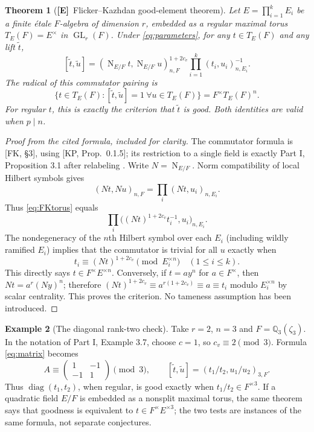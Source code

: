\documentclass[11pt]{article}
\newcommand{\GL}{\operatorname{GL}}
\newcommand{\Nm}{\operatorname{N}}
\newcommand{\Etag}{\textnormal{\textbf{[E]}}}
\theoremstyle{plain}
\newtheorem{theorem}{Theorem}[section]
\theoremstyle{definition}
\newtheorem{example}[theorem]{Example}
\begin{document}
\begin{theorem}[\Etag\ Flicker--Kazhdan good-element theorem]\label{thm:FKgood}
Let $E=\prod_{i=1}^kE_i$ be a finite \emph{\'etale} $F$-algebra
of dimension $r$, embedded as a regular maximal torus
$T_E(F)=E^\times$ in $\GL_r(F)$.  Under \eqref{eq:parameters},
for any $t\in T_E(F)$ and any lift $\widetilde t$,
\begin{equation}\label{eq:FKtorus}
 [\widetilde t,\widetilde u]
 =(\Nm_{E/F}t,\Nm_{E/F}u)_{n,F}^{1+2c_v}
   \prod_{i=1}^k(t_i,u_i)_{n,E_i}^{-1}.
\end{equation}
The radical of this commutator pairing is
\begin{equation}\label{eq:everygood}
 \{t\in T_E(F):[\widetilde t,\widetilde u]=1\ \forall u\in T_E(F)\}
 =F^\times T_E(F)^n.
\end{equation}
For regular $t$, this is exactly the criterion that $\widetilde t$
is good.  Both identities are valid when $p\mid n$.
\end{theorem}
\begin{proof}[Proof from the cited formula, included for clarity]
The commutator formula is [FK, \S3], using [KP, Prop.~0.1.5];
its restriction to a single field is exactly Part I,
Proposition 3.1 after relabeling \cite{JoynerI}.  Write $N=\Nm_{E/F}$.
Norm compatibility of local Hilbert symbols gives
\[
 (Nt,Nu)_{n,F}
 =\prod_i(Nt,u_i)_{n,E_i}.
\]
Thus \eqref{eq:FKtorus} equals
\[
 \prod_i\bigl((Nt)^{1+2c_v}t_i^{-1},u_i\bigr)_{n,E_i}.
\]
The nondegeneracy of the $n$th Hilbert symbol over each $E_i$
(including wildly ramified $E_i$) implies that the commutator is
trivial for all $u$ exactly when
\begin{equation}\label{eq:pointwisegood}
 t_i\equiv(Nt)^{1+2c_v}\pmod{E_i^{\times n}}
 \quad (1\leq i\leq k).
\end{equation}
This directly says $t\in F^\times E^{\times n}$.  Conversely,
if $t=ay^n$ for $a\in F^\times$, then
$Nt=a^r(Ny)^n$; therefore
$(Nt)^{1+2c_v}\equiv a^{r(1+2c_v)}\equiv a\equiv t_i$
modulo $E_i^{\times n}$ by scalar centrality.  This proves the
criterion.  No tameness assumption has been introduced.
\end{proof}

\begin{example}[The diagonal rank-two check]\label{ex:diag}
Take $r=2$, $n=3$ and $F=\mathbb Q_3(\zeta_3)$.
In the notation of Part I, Example 3.7, choose $c=1$, so
$c_v\equiv2\pmod3$.  Formula \eqref{eq:matrix} becomes
\[
 A\equiv\begin{pmatrix}1&-1\\-1&1\end{pmatrix}\pmod3,
 \qquad
 [\widetilde t,\widetilde u]
 =(t_1/t_2,u_1/u_2)_{3,F}.
\]
Thus $\operatorname{diag}(t_1,t_2)$, when regular, is good exactly
when $t_1/t_2\in F^{\times3}$.  If a quadratic field $E/F$ is
embedded as a nonsplit maximal torus, the same theorem says that
goodness is equivalent to $t\in F^\times E^{\times3}$; the two
tests are instances of the same formula, not separate conjectures.
\end{example}
\end{document}
